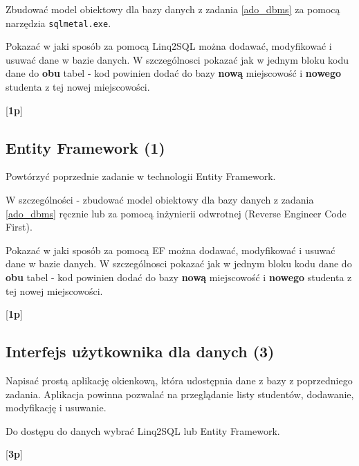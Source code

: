   Zbudować model obiektowy dla bazy danych z zadania \ref{ado_dbms} za pomocą narzędzia {\tt sqlmetal.exe}. 
\label{linq2sql}  
  
  Pokazać w jaki sposób za pomocą Linq2SQL można dodawać, modyfikować i usuwać dane w bazie danych.
  W szczególnosci pokazać jak w jednym bloku kodu dane do {\bf obu} tabel - kod powinien dodać do bazy {\bf nową} miejscowość i {\bf nowego} studenta
  z tej nowej miejscowości. 
    
  [{\bf 1p}]

\subsection{Entity Framework (1)}

  Powtórzyć poprzednie zadanie w technologii Entity Framework.
  
  W szczególności - zbudować model obiektowy dla bazy danych z zadania \ref{ado_dbms} ręcznie lub za pomocą inżynierii odwrotnej (Reverse Engineer Code First).

  Pokazać w jaki sposób za pomocą EF można dodawać, modyfikować i usuwać dane w bazie danych.
  W szczególnosci pokazać jak w jednym bloku kodu dane do {\bf obu} tabel - kod powinien dodać do bazy {\bf nową} miejscowość i {\bf nowego} studenta
  z tej nowej miejscowości. 

  [{\bf 1p}]

\subsection{Interfejs użytkownika dla danych (3)}

      Napisać prostą aplikację okienkową, która udostępnia dane z bazy z poprzedniego zadania.
\label{ado_dal}	  
      Aplikacja powinna pozwalać na przeglądanie listy studentów, dodawanie, modyfikację i usuwanie.

      Do dostępu do danych wybrać Linq2SQL lub Entity Framework.

      [{\bf 3p}]
